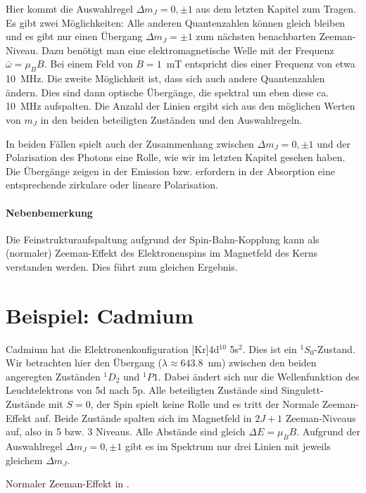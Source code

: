 Hier kommt die Auswahlregel $\Delta m_J = 0, \pm1$ aus dem letzten Kapitel zum Tragen. Es gibt zwei Möglichkeiten: Alle anderen Quantenzahlen können gleich bleiben und es gibt nur einen Übergang $\Delta m_J = \pm1$ zum nächsten benachbarten Zeeman-Niveau. Dazu benötigt man eine elektromagnetische Welle mit der Frequenz $\bar \omega = \mu_B B$. Bei einem Feld von $B=1$~mT entspricht dies einer Frequenz von etwa 10~MHz. Die zweite Möglichkeit ist, dass sich auch andere Quantenzahlen ändern. Dies sind dann optische Übergänge, die spektral um eben diese ca. 10~MHz aufspalten. Die Anzahl der Linien ergibt sich aus den möglichen Werten von $m_J$ in den beiden beteiligten Zuständen und den Auswahlregeln.


In beiden Fällen spielt auch der Zusammenhang zwischen $\Delta m_J = 0, \pm1$ und der Polarisation des Photons eine Rolle, wie wir im letzten Kapitel gesehen haben. Die Übergänge zeigen in der Emission bzw. erfordern in der Absorption eine entsprechende zirkulare oder lineare Polarisation.


\paragraph{Nebenbemerkung} Die Feinstrukturaufspaltung aufgrund der Spin-Bahn-Kopplung kann als (normaler) Zeeman-Effekt des Elektronenspins im Magnetfeld des Kerns verstanden werden. Dies führt zum gleichen Ergebnis.

\section{Beispiel: Cadmium}

Cadmium hat die Elektronenkonfiguration [Kr]4d$^{10}$ 5s$^2$. Dies ist ein $^1S_0$-Zustand. Wir betrachten hier den Übergang ($\lambda \approx 643.8$~nm) zwischen den beiden angeregten Zuständen $^1D_2$ und $^1P1$. Dabei ändert sich nur die Wellenfunktion des Leuchtelektrons von 5d nach 5p. Alle beteiligten Zustände sind Singulett-Zustände mit $S=0$, der Spin spielt keine Rolle und es tritt der Normale Zeeman-Effekt auf. Beide Zustände spalten sich im Magnetfeld in $2J+1$ Zeeman-Niveaus auf, also in 5 bzw. 3 Niveaus. Alle Abstände sind gleich $\Delta E = \mu_B B$. Aufgrund der Auswahlregel $\Delta m_J = 0, \pm1$ gibt es im Spektrum nur drei Linien mit jeweils gleichem $\Delta m_J$.

\begin{marginfigure} 
    \caption{Normaler Zeeman-Effekt in .}
\end{marginfigure}


